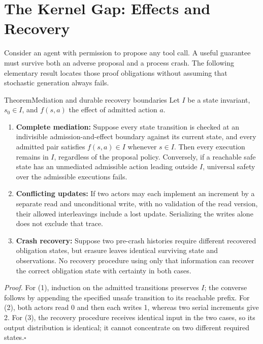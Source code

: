 \documentclass[11pt,a4paper]{article}
\begin{document}
\section{The Kernel Gap: Effects and Recovery}\label{pre:sec:kernel-gap}

Consider an agent with permission to propose any tool call. A useful guarantee must survive both an adverse proposal and a process crash. The following elementary result locates those proof obligations without assuming that stochastic generation always fails.

\begin{pdclaim}{Theorem}{Mediation and durable recovery boundaries}\label{thm:kernel-gap}
Let $I$ be a state invariant, $s_0\in I$, and $f(s,a)$ the effect of admitted action $a$.
\begin{enumerate}[leftmargin=1.5em,itemsep=1.5pt]
  \item \textbf{Complete mediation:} Suppose every state transition is checked at an indivisible admission-and-effect boundary against its current state, and every admitted pair satisfies $f(s,a)\in I$ whenever $s\in I$. Then every execution remains in $I$, regardless of the proposal policy. Conversely, if a reachable safe state has an unmediated admissible action leading outside $I$, universal safety over the admissible executions fails.
  \item \textbf{Conflicting updates:} If two actors may each implement an increment by a separate read and unconditional write, with no validation of the read version, their allowed interleavings include a lost update. Serializing the writes alone does not exclude that trace.
  \item \textbf{Crash recovery:} Suppose two pre-crash histories require different recovered obligation states, but erasure leaves identical surviving state and observations. No recovery procedure using only that information can recover the correct obligation state with certainty in both cases.
\end{enumerate}
\end{pdclaim}
\noindent\textit{Proof.} For (1), induction on the admitted transitions preserves $I$; the converse follows by appending the specified unsafe transition to its reachable prefix. For (2), both actors read 0 and then each writes 1, whereas two serial increments give 2. For (3), the recovery procedure receives identical input in the two cases, so its output distribution is identical; it cannot concentrate on two different required states.\hfill$\square$
\end{document}

